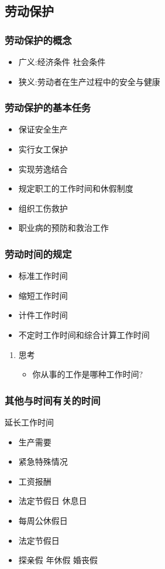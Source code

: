 \documentclass{ctexart}
\begin{document}
\subsection{劳动保护}
\label{sec-3-4}
\subsubsection{劳动保护的概念}
\label{sec-3-4-1}
\begin{itemize}
\item 广义:经济条件 社会条件
\item 狭义:劳动者在生产过程中的安全与健康
\end{itemize}
\subsubsection{劳动保护的基本任务}
\label{sec-3-4-2}
\begin{itemize}
\item 保证安全生产
\item 实行女工保护
\item 实现劳逸结合
\item 规定职工的工作时间和休假制度
\item 组织工伤救护
\item 职业病的预防和救治工作
\end{itemize}
\subsubsection{劳动时间的规定}
\label{sec-3-4-3}
\begin{itemize}
\item 标准工作时间
\item 缩短工作时间
\item 计件工作时间
\item 不定时工作时间和综合计算工作时间
\end{itemize}
\begin{enumerate}
\item 思考
\label{sec-3-4-3-1}
\begin{itemize}
\item 你从事的工作是哪种工作时间?
\end{itemize}
\end{enumerate}
\subsubsection{其他与时间有关的时间}
\label{sec-3-4-4}
延长工作时间
\begin{itemize}
\item 生产需要
\item 紧急特殊情况
\item 工资报酬
\item 法定节假日 休息日
\item 每周公休假日
\item 法定节假日
\item 探亲假 年休假 婚丧假
\end{itemize}
\end{document}
